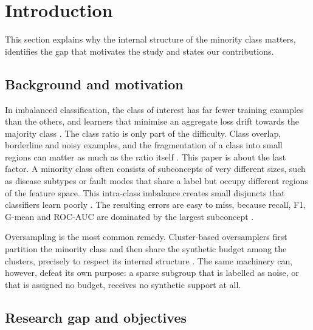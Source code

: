 \documentclass[preprint,nopreprintline]{elsarticle}
\theoremstyle{plain}
\theoremstyle{definition}
\begin{document}
\section{Introduction}\label{sec:intro}

This section explains why the internal structure of the minority class matters, identifies the gap that motivates the study and states our contributions.

\subsection{Background and motivation}\label{sec:background}

In imbalanced classification, the class of interest has far fewer training examples than the others, and learners that minimise an aggregate loss drift towards the majority class \cite{japkowicz2002class,he2009learning}. The class ratio is only part of the difficulty. Class overlap, borderline and noisy examples, and the fragmentation of a class into small regions can matter as much as the ratio itself \cite{prati2004class,napierala2016types}. This paper is about the last factor. A minority class often consists of subconcepts of very different sizes, such as disease subtypes or fault modes that share a label but occupy different regions of the feature space. This intra-class imbalance creates small disjuncts that classifiers learn poorly \cite{holte1989concept,japkowicz2001concept,jo2004class}. The resulting errors are easy to miss, because recall, F1, G-mean and ROC-AUC are dominated by the largest subconcept \cite{bellinger2024performance}.

Oversampling is the most common remedy. Cluster-based oversamplers first partition the minority class and then share the synthetic budget among the clusters, precisely to respect its internal structure \cite{jo2004class,douzas2018kmeans,bunkhumpornpat2012dbsmote}. The same machinery can, however, defeat its own purpose: a sparse subgroup that is labelled as noise, or that is assigned no budget, receives no synthetic support at all.

\subsection{Research gap and objectives}\label{sec:gap}
\end{document}
